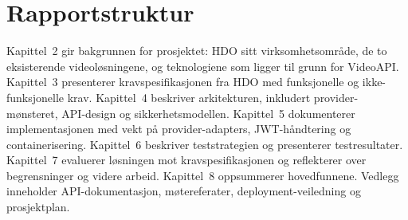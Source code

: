 \section{Rapportstruktur}
\label{sec:rapportstruktur}

Kapittel~2 gir bakgrunnen for prosjektet: HDO sitt virksomhetsområde, 
de to eksisterende videoløsningene, og teknologiene som ligger til 
grunn for VideoAPI. Kapittel~3 presenterer kravspesifikasjonen fra 
HDO med funksjonelle og ikke-funksjonelle krav. Kapittel~4 beskriver 
arkitekturen, inkludert provider-mønsteret, API-design og 
sikkerhetsmodellen. Kapittel~5 dokumenterer implementasjonen med 
vekt på provider-adapters, JWT-håndtering og containerisering. 
Kapittel~6 beskriver teststrategien og presenterer testresultater. 
Kapittel~7 evaluerer løsningen mot kravspesifikasjonen og reflekterer 
over begrensninger og videre arbeid. Kapittel~8 oppsummerer 
hovedfunnene. Vedlegg inneholder API-dokumentasjon, møtereferater, 
deployment-veiledning og prosjektplan.